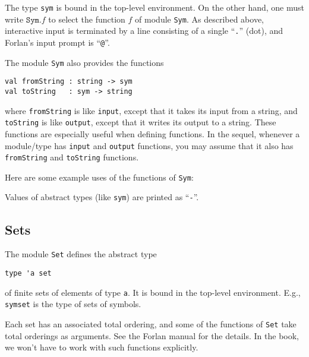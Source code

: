 The type \texttt{sym} is bound in the top-level environment.  On the
other hand, one must write $\mathtt{Sym.}f$ to select the function $f$
of module \texttt{Sym}.
As described above, interactive input is terminated by a
line consisting of a single ``\texttt{.}'' (dot), and Forlan's
input prompt is ``\texttt{@}''.
%
%
%

The module \texttt{Sym} also provides the functions
\begin{verbatim}
val fromString : string -> sym
val toString   : sym -> string
\end{verbatim}
%
%
where \texttt{fromString} is like \texttt{input}, except that it takes
its input from a string, and \texttt{toString} is like
\texttt{output}, except that it writes its output to a string.  These
functions are especially useful when defining functions.  In the
sequel, whenever a module/type has \texttt{input} and \texttt{output}
functions, you may assume that it also has \texttt{fromString} and
\texttt{toString} functions.

Here are some example uses of the functions of \texttt{Sym}:

Values of abstract types (like \texttt{sym}) are printed
as ``\texttt{-}''.

\subsection{Sets}

The module \texttt{Set}
%
defines the abstract type
\begin{verbatim}
type 'a set
\end{verbatim}
%
%
of finite sets
%
of elements of type \texttt{\primesym a}.  It is bound in the
top-level environment.  E.g., \texttt{sym\;set} is the type of sets of
symbols.

Each set has an associated total ordering, and some of the functions
of \texttt{Set} take total orderings as arguments.  See the Forlan
manual for the details.  In the book, we won't have to work with
such functions explicitly.

